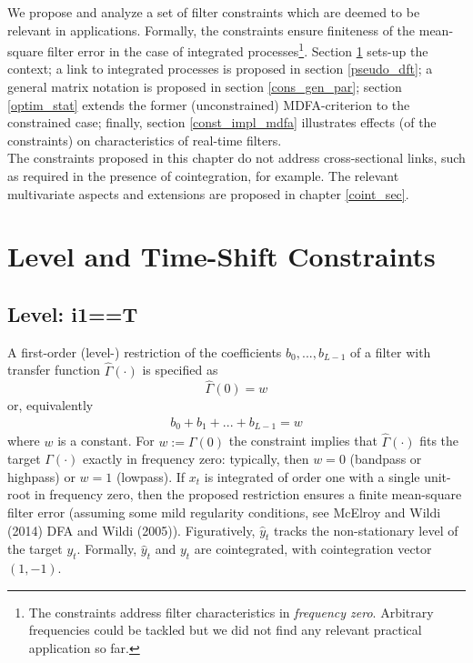 \documentclass[a4paper]{book}
\begin{document}
We propose and analyze a set of filter constraints which are deemed to be relevant in applications. Formally, the constraints ensure finiteness of the mean-square filter error in the case of integrated processes\footnote{The constraints address filter characteristics in \emph{frequency zero}. Arbitrary frequencies could be tackled but we did not find any relevant practical application so far.}. Section \ref{i1i2_intr} sets-up the context; a link to integrated processes is proposed in section \ref{pseudo_dft}; a general matrix notation is proposed in section \ref{cons_gen_par}; section \ref{optim_stat} extends the former (unconstrained) MDFA-criterion to the constrained case; finally, section \ref{const_impl_mdfa} illustrates effects (of the constraints) on characteristics of real-time filters.  \\

The constraints proposed in this chapter do not address cross-sectional links, such as required in the presence of cointegration, for example. The relevant multivariate aspects and extensions are proposed in chapter \ref{coint_sec}.

\section{Level and Time-Shift Constraints}\label{i1i2_intr}

\subsection{Level: i1==T}

A first-order (level-) restriction of the coefficients  $b_0,...,b_{L-1}$ of a filter with transfer function $\hat{\Gamma}(\cdot)$ is specified as
\[
\hat{\Gamma}(0)=w
\]
or, equivalently
\begin{eqnarray}\label{cons1}
b_0+b_1+...+b_{L-1}=w
\end{eqnarray}
where $w$ is a constant. For $w:=\Gamma(0)$ the constraint implies that $\hat{\Gamma}(\cdot)$ fits the target $\Gamma(\cdot)$ exactly in frequency zero: typically, then $w=0$ (bandpass or highpass) or $w=1$ (lowpass). If $x_t$ is integrated of order one with a single unit-root in frequency zero, then the proposed restriction ensures a finite mean-square filter error (assuming some mild regularity conditions, see McElroy and Wildi (2014) DFA and Wildi (2005)). Figuratively,  $\hat{y}_t$ tracks the non-stationary level of the target $y_t$. Formally, $\hat{y}_t$ and $y_t$ are cointegrated, with cointegration vector $(1,-1)$.\\
\end{document}
